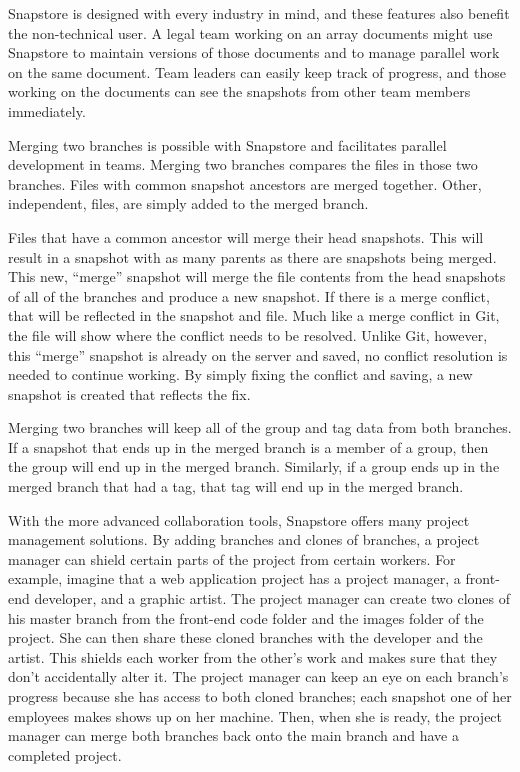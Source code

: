 Snapstore is designed with every industry in mind, and these features also benefit the non-technical user. A legal team working on an array documents might use Snapstore to maintain versions of those documents and to manage parallel work on the same document. Team leaders can easily keep track of progress, and those working on the documents can see the snapshots from other team members immediately.

Merging two branches is possible with Snapstore and facilitates parallel development in teams. Merging two branches compares the files in those two branches. Files with common snapshot ancestors are merged together. Other, independent, files, are simply added to the merged branch. 

Files that have a common ancestor will merge their head snapshots. This will result in a snapshot with as many parents as there are snapshots being merged. This new, ``merge'' snapshot will merge the file contents from the head snapshots of all of the branches and produce a new snapshot. If there is a merge conflict, that will be reflected in the snapshot and file. Much like a merge conflict in Git, the file will show where the conflict needs to be resolved. Unlike Git, however, this ``merge'' snapshot is already on the server and saved, no conflict resolution is needed to continue working. By simply fixing the conflict and saving, a new snapshot is created that reflects the fix.

Merging two branches will keep all of the group and tag data from both branches. If a snapshot that ends up in the merged branch is a member of a group, then the group will end up in the merged branch. Similarly, if a group ends up in the merged branch that had a tag, that tag will end up in the merged branch.

With the more advanced collaboration tools, Snapstore offers many project management solutions. By adding branches and clones of branches, a project manager can shield certain parts of the project from certain workers. For example, imagine that a web application project has a project manager, a front-end developer, and a graphic artist. The project manager can create two clones of his master branch from the front-end code folder and the images folder of the project. She can then share these cloned branches with the developer and the artist. This shields each worker from the other's work and makes sure that they don't accidentally alter it. The project manager can keep an eye on each branch's progress because she has access to both cloned branches; each snapshot one of her employees makes shows up on her machine. Then, when she is ready, the project manager can merge both branches back onto the main branch and have a completed project.

